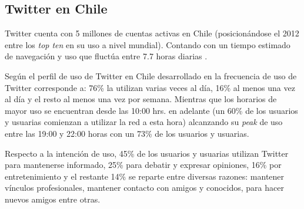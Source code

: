 \subsection{Twitter en Chile}

Twitter cuenta con 5 millones de cuentas activas en Chile (posicionándose el 2012 entre los \emph{top ten} en su uso a nivel mundial). Contando con un tiempo estimado de navegación y uso que fluctúa entre 7.7 horas diarias \cite{rankingChileSemiocast}.

Según el perfil de uso de Twitter en Chile desarrollado en \cite{udpperfiluso} la frecuencia de uso de Twitter corresponde a: 76\% la utilizan varias veces al día, 16\% al menos una vez al día y el resto al menos una vez por semana. Mientras que los horarios de mayor uso se encuentran desde las 10:00 hrs. en adelante (un 60\% de los usuarios y usuarias comienzan a utilizar la red a esta hora) alcanzando su \emph{peak} de uso entre las 19:00 y 22:00 horas con un 73\% de los usuarios y usuarias.

Respecto a la intención de uso, 45\% de los usuarios y usuarias utilizan Twitter para mantenerse informado, 25\% para debatir y expresar opiniones, 16\% por entretenimiento y el restante 14\% se reparte entre diversas razones: mantener vínculos profesionales, mantener contacto con amigos y conocidos, para hacer nuevos amigos entre otras.